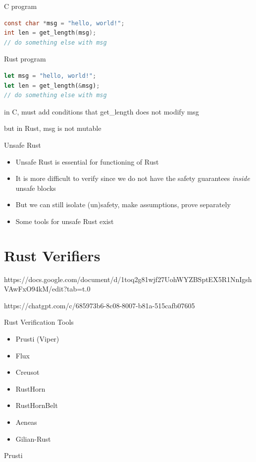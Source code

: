 \documentclass{beamer}
\begin{document}
\begin{frame}[fragile]
\begin{block}{C program}
\begin{lstlisting}[language=C]
const char *msg = "hello, world!"; 
int len = get_length(msg);
// do something else with msg
\end{lstlisting}
\end{block}

\begin{block}{Rust program}
\begin{lstlisting}[language=rust]
let msg = "hello, world!"; 
let len = get_length(&msg);  
// do something else with msg
\end{lstlisting}
\end{block}


in C, must add conditions that get\_length does not modify 
msg

but in Rust, msg is not mutable
\end{frame}

\begin{frame}{Unsafe Rust} 
\begin{itemize}
\item 
Unsafe Rust is essential for functioning of Rust 
\item 
It is more difficult to verify since we do not have the safety guarantees \emph{inside} unsafe blocks
\item 
But we can still isolate (un)safety, make assumptions, prove separately
\item 
Some tools for unsafe Rust exist
\end{itemize} 
\end{frame} 

\section{Rust Verifiers}

https://docs.google.com/document/d/1toq2g81wjf27UohWYZBSptEX5R1NnIgshVAwFxO94kM/edit?tab=t.0

https://chatgpt.com/c/685973b6-8c08-8007-b81a-515cafb07605

\begin{frame}{Rust Verification Tools}
\begin{itemize} 
\item Prusti (Viper)
\item Flux
\item Creusot
\item RustHorn
\item RustHornBelt
\item Aeneas
\item Gilian-Rust
\end{itemize} 
\end{frame}

\begin{frame}{Prusti} 

\end{frame}
\end{document}
